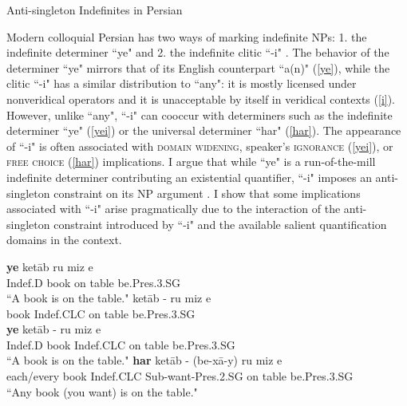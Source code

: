 \documentclass [11pt] {article}
\begin{document}
\begin {center}
{\large Anti-singleton Indefinites in Persian}
\end {center}

Modern colloquial Persian has two ways of marking indefinite NPs: 1. the indefinite determiner ``ye" and 2. the indefinite clitic ``-i" \citep{ghomeshi2003plural, toosarvandani2014quantification}. The behavior of the determiner ``ye" mirrors that of its English counterpart ``a(n)" (\ref{ye}), while the clitic ``-i" has a similar distribution to ``any": it is mostly licensed under nonveridical operators and it is unacceptable by itself in veridical contexts (\ref{i}). However, unlike ``any", ``-i" can cooccur with determiners such as the indefinite determiner ``ye" (\ref{yei}) or the universal determiner ``har" (\ref{har}). The appearance of ``-i" is often associated with \textsc{domain widening}, speaker's \textsc{ignorance} (\ref{yei}), or \textsc{free choice} (\ref{har}) implications. I argue that while ``ye" is a run-of-the-mill indefinite determiner contributing an existential quantifier, ``-i" imposes an anti-singleton constraint on its NP argument \citep{alonso2008minimal, alonso2010modal}. I show that some implications associated with ``-i" arise pragmatically due to the interaction of the anti-singleton constraint introduced by ``-i" and the available salient quantification domains in the context.

	\begin {exe}
		\ex \begin {xlist}
		\ex \label {ye}
		\gll	\textbf{ye}	ket\={a}b	ru	miz	e \\
				{\scriptsize Indef.D}	book	on	table	be.{\scriptsize Pres.3.SG}\\
		\glt 	``A book is on the table."
		\ex \label {i}
		\gll	* 	ket\={a}b	-	ru	miz	e \\
				{} 	book	{\scriptsize Indef.CLC}	on	table	be.{\scriptsize Pres.3.SG}\\
		\ex \label {yei}
		\gll	\textbf{ye}	ket\={a}b	-	ru	miz	e \\
				{\scriptsize Indef.D}	book	{\scriptsize Indef.CLC}	on	table	be.{\scriptsize Pres.3.SG}\\
		\glt 	``A book is on the table."
		\ex \label {har}
		\gll	\textbf{har}	ket\={a}b	-	(be-x\={a}-y)	ru	miz	e \\
				each/every	book	{\scriptsize Indef.CLC}	{\scriptsize Sub}-want-{\scriptsize Pres.2.SG}	on	table	be.{\scriptsize Pres.3.SG}\\
		\glt 	``Any book (you want) is on the table."
		\end {xlist}
	\end {exe}
\end{document}
